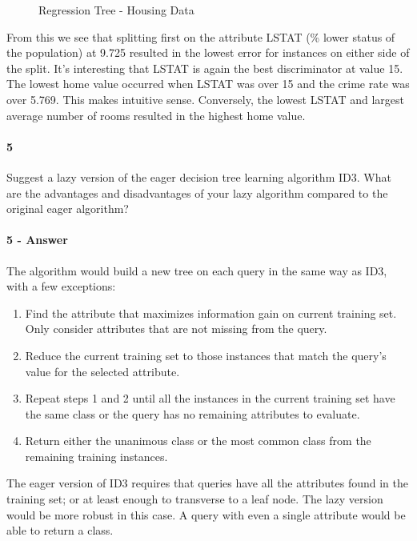 \documentclass[10pt,letter]{article}
\begin{document}
\begin{figure}[!htbp]
    \theverbbox
    \centering
    \caption{Regression Tree - Housing Data\label{regression-tree}}
\end{figure}

From this we see that splitting first on the attribute LSTAT (\% lower status of the population) at 9.725 resulted in the lowest error for instances on either side of the split. It's interesting that LSTAT is again the best discriminator at value 15. The lowest home value occurred when LSTAT was over 15 and the crime rate was over 5.769. This makes intuitive sense. Conversely, the lowest LSTAT and largest average number of rooms resulted in the highest home value.




\paragraph{5} Suggest a lazy version of the eager decision tree learning algorithm ID3. What are the advantages and disadvantages of your lazy algorithm compared to the original eager algorithm?

\paragraph{5 - Answer}

The algorithm would build a new tree on each query in the same way as ID3, with a few exceptions:

\begin{enumerate}
    \item Find the attribute that maximizes information gain on current training set. Only consider attributes that are not missing from the query.
    \item Reduce the current training set to those instances that match the query's value for the selected attribute.
    \item Repeat steps 1 and 2 until all the instances in the current training set have the same class or the query has no remaining attributes to evaluate.
    \item Return either the unanimous class or the most common class from the remaining training instances.
\end{enumerate}

The eager version of ID3 requires that queries have all the attributes found in the training set; or at least enough to transverse to a leaf node. The lazy version would be more robust in this case. A query with even a single attribute would be able to return a class.
\end{document}
